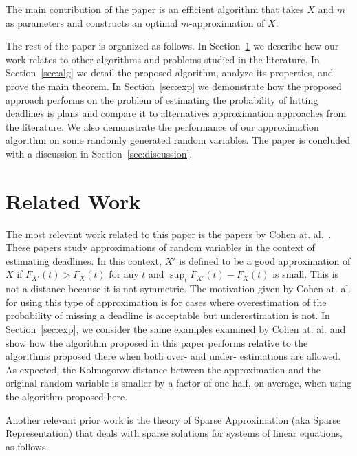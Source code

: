 \documentclass{article}
\newtheorem{theorem}[thm]{Theorem}
\DeclareMathOperator{\support}{support}
\begin{document}
The main contribution of the paper is an efficient algorithm that takes $X$ and $m$ as parameters and constructs an optimal $m$-approximation of $X$.


The rest of the paper is organized as follows. In Section~\ref{sec:rel-work} we describe how our work relates to other algorithms and problems studied in the literature. In Section~\ref{sec:alg} we detail the proposed algorithm, analyze its properties, and prove the main theorem. In Section~\ref{sec:exp} we demonstrate how the proposed approach performs on the problem of estimating the probability of hitting deadlines is plans and compare it to alternatives approximation approaches from the literature. We also demonstrate the performance of our approximation algorithm on some randomly generated random variables. The paper is concluded with a discussion in Section~\ref{sec:discussion}.

\section{Related Work}
\label{sec:rel-work}
The most relevant work related to this paper is the papers by Cohen at. al.~\cite{cohen2015estimating,CohenGW18}. These papers study approximations of random variables in the context of estimating deadlines. In this context, $X'$ is defined to be a good approximation of $X$ if $F_{X'}(t) > F_{X}(t)$ for any $t$ and $\sup_t F_{X'}(t) - F_{X}(t)$ is small. This is not a distance because it is not symmetric. The motivation given by Cohen at. al. for using this type of approximation is for cases where overestimation of the probability of missing a deadline is acceptable but underestimation is not. In Section~\ref{sec:exp}, we consider the same examples examined by Cohen at. al. and show how the algorithm proposed in this paper performs relative to the algorithms proposed there when both over- and under- estimations are allowed. As expected, the Kolmogorov distance between the approximation and the original random variable is smaller by a factor of one half, on average, when using the algorithm proposed here. 


Another relevant prior work is the theory of Sparse Approximation (aka Sparse Representation) that deals with sparse solutions for systems of linear equations, as follows. 
\end{document}

